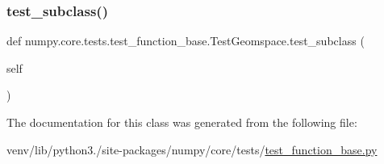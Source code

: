 \mbox{\label{classnumpy_1_1core_1_1tests_1_1test__function__base_1_1TestGeomspace_af038960074008512f12f544a35cfa7c6}} 
\subsubsection{\texorpdfstring{test\+\_\+subclass()}{test\_subclass()}}
{\footnotesize\ttfamily def numpy.\+core.\+tests.\+test\+\_\+function\+\_\+base.\+Test\+Geomspace.\+test\+\_\+subclass (\begin{DoxyParamCaption}\item[{}]{self }\end{DoxyParamCaption})}



The documentation for this class was generated from the following file\+:\begin{DoxyCompactItemize}
\item 
venv/lib/python3./site-\/packages/numpy/core/tests/\hyperlink{core_2tests_2test__function__base_8py}{test\+\_\+function\+\_\+base.\+py}\end{DoxyCompactItemize}
